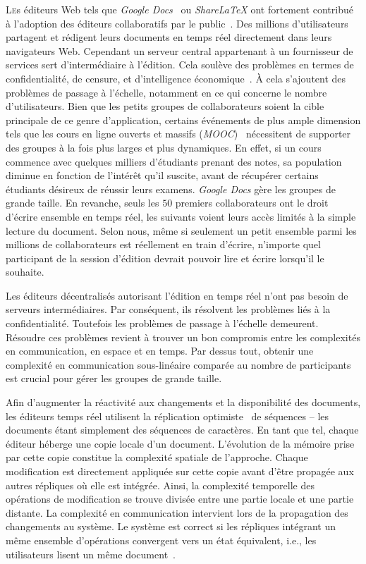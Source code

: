 
\lettrine{L}es éditeurs Web tels que \emph{Google Docs}~\cite{googledocs} ou
\emph{ShareLaTeX}\cite{sharelatex} ont fortement contribué à l'adoption des
éditeurs collaboratifs par le public~\cite{mogan2010impact}. Des millions
d'utilisateurs partagent et rédigent leurs documents en temps réel directement
dans leurs navigateurs Web. Cependant un serveur central appartenant à un
fournisseur de services sert d'intermédiaire à l'édition. Cela soulève des
problèmes en termes de confidentialité, de censure, et d'intelligence
économique~\cite{cherrueau2016composer, gellman2013us, pearson2011toward}. À
cela s'ajoutent des problèmes de passage à l'échelle, notamment en ce qui
concerne le nombre d'utilisateurs. Bien que les petits groupes de collaborateurs
soient la cible principale de ce genre d'application, certains événements de
plus ample dimension tels que les cours en ligne ouverts et massifs
(\emph{MOOC})~\cite{breslow2013studying} nécessitent de supporter des groupes à
la fois plus larges et plus dynamiques. En effet, si un cours commence avec
quelques milliers d'étudiants prenant des notes, sa population diminue en
fonction de l'intérêt qu'il suscite, avant de récupérer certains étudiants
désireux de réussir leurs examens. \emph{Google Docs} gère les groupes de grande
taille. En revanche, seuls les $50$ premiers collaborateurs ont le droit
d'écrire ensemble en temps réel, les suivants voient leurs accès limités à la
simple lecture du document. Selon nous, même si seulement un petit ensemble
parmi les millions de collaborateurs est réellement en train d'écrire, n'importe
quel participant de la session d'édition devrait pouvoir lire et écrire
lorsqu'il le souhaite.

Les éditeurs décentralisés autorisant l'édition en temps réel n'ont pas besoin
de serveurs intermédiaires. Par conséquent, ils résolvent les problèmes liés à
la confidentialité. Toutefois les problèmes de passage à l'échelle
demeurent. Résoudre ces problèmes revient à trouver un bon compromis entre les
complexités en communication, en espace et en temps. Par dessus tout, obtenir
une complexité en communication sous-linéaire comparée au nombre de participants
est crucial pour gérer les groupes de grande taille.

Afin d'augmenter la réactivité aux changements et la disponibilité des
documents, les éditeurs temps réel utilisent la réplication
optimiste~\cite{demers1987epidemic, ladin1992providing, saito2005optimistic,
sun1998achieving} de séquences -- les documents étant simplement des séquences
de caractères. En tant que tel, chaque éditeur héberge une copie locale d'un
document. L'évolution de la mémoire prise par cette copie constitue la
complexité spatiale de l'approche. Chaque modification est directement appliquée
sur cette copie avant d'être propagée aux autres répliques où elle est
intégrée. Ainsi, la complexité temporelle des opérations de modification se
trouve divisée entre une partie locale et une partie distante. La complexité en
communication intervient lors de la propagation des changements au système. Le
système est correct si les répliques intégrant un même ensemble d'opérations
convergent vers un état équivalent, i.e., les utilisateurs lisent un même
document~\cite{bailis2013eventual, shapiro2011conflict}.

